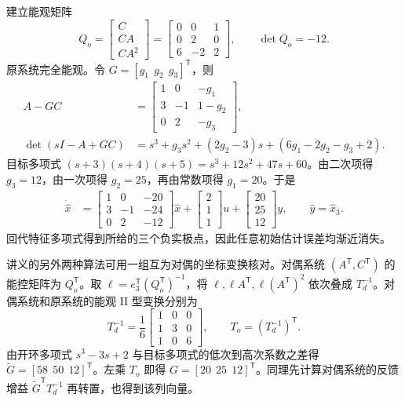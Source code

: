\sol 建立能观矩阵
\[
   Q_o=\begin{bmatrix}C\\CA\\CA^2\end{bmatrix}
      =\begin{bmatrix}0&0&1\\0&2&0\\6&-2&2\end{bmatrix},
   \qquad \det Q_o=-12 .
\]
原系统完全能观。令 $G=[g_1\ \ g_2\ \ g_3]^{\mathsf T}$，则
\[
\begin{aligned}
    A-GC&=\begin{bmatrix}1&0&-g_1\\3&-1&1-g_2\\0&2&-g_3\end{bmatrix},\\
    \det(sI-A+GC)&=s^3+g_3s^2+(2g_2-3)s+(6g_1-2g_2-g_3+2).
\end{aligned}
\]
目标多项式 $(s+3)(s+4)(s+5)=s^3+12s^2+47s+60$。由二次项得 $g_3=12$，由一次项得 $g_2=25$，再由常数项得 $g_1=20$。于是
\[
\begin{aligned}
    \dot{\hat x}
       &=\begin{bmatrix}1&0&-20\\3&-1&-24\\0&2&-12\end{bmatrix}\hat x
          +\begin{bmatrix}2\\1\\1\end{bmatrix}u
          +\begin{bmatrix}20\\25\\12\end{bmatrix}y,\qquad
     \hat y=\hat x_3 .
\end{aligned}
\]
回代特征多项式得到所给的三个负实极点，因此任意初始估计误差均渐近消失。

讲义的另外两种算法可用一组互为对偶的坐标变换核对。对偶系统 $(A^{\mathsf T},C^{\mathsf T})$ 的能控矩阵为 $Q_o^{\mathsf T}$。取 $\ell=e_3^{\mathsf T}(Q_o^{\mathsf T})^{-1}$，将 $\ell,\ell A^{\mathsf T},\ell(A^{\mathsf T})^2$ 依次叠成 $T_d^{-1}$。对偶系统和原系统的能观 II 型变换分别为
\[
    T_d^{-1}=\frac16\begin{bmatrix}1&0&0\\1&3&0\\1&0&6\end{bmatrix},
    \qquad T_o=(T_d^{-1})^{\mathsf T}.
\]
由开环多项式 $s^3-3s+2$ 与目标多项式的低次到高次系数之差得 $\widetilde G=[58\ \ 50\ \ 12]^{\mathsf T}$。左乘 $T_o$ 即得 $G=[20\ \ 25\ \ 12]^{\mathsf T}$。同理先计算对偶系统的反馈增益 $\widetilde G^{\mathsf T}T_d^{-1}$ 再转置，也得到该列向量。

